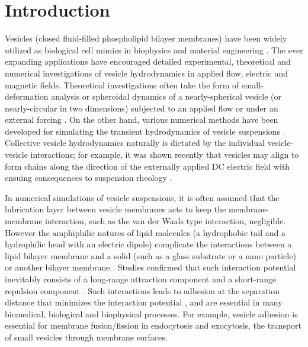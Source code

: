 \documentclass[aps,prl,twocolumn,showpacs,amsmath,amssymb]{revtex4-1}
\begin{document}



\section{Introduction}
Vesicles (closed fluid-filled phospholipid bilayer membranes) have been widely utilized
as biological cell mimics in biophysics and material engineering \cite{}. 
%
The ever expanding applications have encouraged detailed experimental, theoretical and numerical investigations of vesicle hydrodynamics
in applied flow, electric and magnetic fields. Theoretical investigations often take the form of small-deformation analysis or spheroidal dynamics of a nearly-spherical vesicle (or nearly-circular in two dimensions) subjected to an applied flow or under an external forcing \cite{Barthes-BieselRallison1981_JFM,Misbah2006_PRL,Vlahovska2007_PRE,Finken2008_EPL,ZhangZahnTanLin2013_PoF,Nganguia2013_PRE}. 
On the other hand, various numerical methods have been developed for simulating the transient hydrodynamics of vesicle suspensions  \cite{BagchiJohoson2005_JBE,Biben2005_EJP,Veerapaneni2009_JCP,SeolHuKimLai2016_JCP}.  
Collective vesicle hydrodynamics naturally is dictated by the individual vesicle-vesicle interactions;  for example, 
it was shown recently that vesicles may align to form chains along the direction of the externally applied DC electric field with ensuing consequences to suspension rheology \cite{wu2018pairwise}.

In numerical simulations of vesicle suspensions, it is often assumed that the lubrication layer between vesicle membranes acts to keep the 
membrane-membrane interaction, such as the van der Waals type interaction, negligible. However the amphiphilic natures of lipid molecules (a hydrophobic tail and a hydrophilic head with an electric dipole) complicate the interactions between a lipid bilayer membrane and a solid (such as a glass substrate or a nano particle) or another bilayer membrane \cite{EvansMetcalfe1984_BJ,Book_PhysicalBasisCellAdhesion,Book_IntermolecularSurfaceForces}.
Studies confirmed that such interaction potential inevitably consists of a long-range attraction component and a short-range repulsion component 
\cite{Book_IntermolecularSurfaceForces}. Such interactions leads to adhesion at the separation distance that minimizes the
interaction potential \cite{Book_IntermolecularSurfaceForces}, and are essential in many biomedical, biological and biophysical processes.
For example, vesicle adhesion is essential for membrane fusion/fission in endocytosis and exocytosis, the transport of small
vesicles through membrane surfaces.
\end{document}

